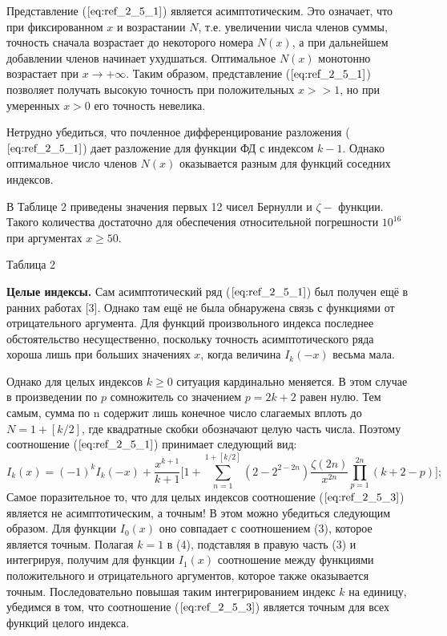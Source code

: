 Представление ($\ref{eq:ref_2_5_1}$) является асимптотическим. Это означает, что при
фиксированном $x$ и возрастании $N$, т.е. увеличении числа членов суммы,
точность сначала возрастает до некоторого номера $N(x)$, а при дальнейшем
добавлении членов начинает ухудшаться. Оптимальное $N(x)$ монотонно
возрастает при $x \to +\infty$. Таким образом, представление ($\ref{eq:ref_2_5_1}$) позволяет получать
высокую точность при положительных $x >> 1$, но при умеренных $x > 0$ его
точность невелика.

Нетрудно убедиться, что почленное дифференцирование разложения ($\ref{eq:ref_2_5_1}$)
дает разложение для функции ФД с индексом $k - 1$. Однако оптимальное
число членов $N(x)$ оказывается разным для функций соседних индексов.

В Таблице 2 приведены значения первых 12 чисел Бернулли и
$\zeta -$ функции. Такого количества достаточно для обеспечения относительной
погрешности $10^{16}$ при аргументах $x \geqslant 50$.

Таблица 2 %


\textbf{Целые индексы.} Сам асимптотический ряд ($\ref{eq:ref_2_5_1}$) был получен ещё в ранних
работах [3]. Однако там ещё не была обнаружена связь с функциями от
отрицательного аргумента. Для функций произвольного индекса последнее
обстоятельство несущественно, поскольку точность асимптотического ряда
хороша лишь при больших значениях $x$, когда величина $I_k(-x)$ весьма мала.

Однако для целых индексов $k \geqslant 0$ ситуация кардинально меняется. В этом
случае в произведении по $p$ сомножитель со значением $p = 2k + 2$ равен нулю.
Тем самым, сумма по n содержит лишь конечное число слагаемых вплоть до
$N=1+[k/2]$, где квадратные скобки обозначают целую часть числа. Поэтому
соотношение ($\ref{eq:ref_2_5_1}$) принимает следующий вид:
\begin{equation}
I_k(x) = (-1)^k I_k(-x)+ \frac{x^{k+1}}{k+1}\Bigg[ 1+\sum\limits_{n=1}^{1+[k/2]} (2-2^{2-2n}) \frac{\zeta (2n)}{x^{2n}}  \prod\limits_{p=1}^{2n} (k+2-p) \Bigg];
\label{eq:ref_2_5_3}
\end{equation}
Самое поразительное то, что для целых индексов соотношение ($\ref{eq:ref_2_5_3}$) является не
асимптотическим, а точным! В этом можно убедиться следующим образом. Для
функции $I_0(x)$ оно совпадает с соотношением (3), которое является точным.
Полагая $k=1$ в (4), подставляя в правую часть (3) и интегрируя, получим для
функции $I_1(x)$ соотношение между функциями положительного и
отрицательного аргументов, которое также оказывается точным.
Последовательно повышая таким интегрированием индекс $k$ на единицу,
убедимся в том, что соотношение ($\ref{eq:ref_2_5_3}$) является точным для всех функций
целого индекса.

